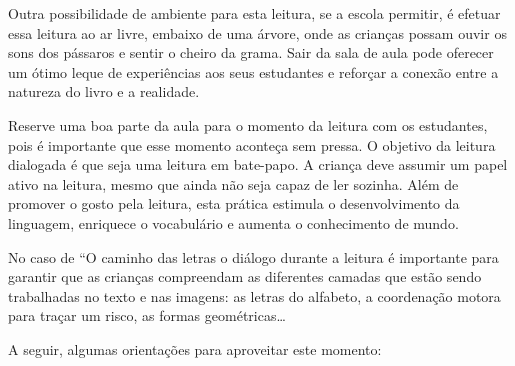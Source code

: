 \documentclass[11pt]{extarticle}
\begin{document}

Outra possibilidade de ambiente para esta leitura, se a escola permitir, 
é efetuar essa leitura ao ar livre, embaixo de uma árvore, onde as crianças 
possam ouvir os sons dos pássaros e sentir o cheiro da grama. Sair da sala 
de aula pode oferecer um ótimo leque de experiências aos seus estudantes e 
reforçar a conexão entre a natureza do livro e a realidade.  

Reserve uma boa parte da aula para o momento da leitura com os estudantes, 
pois é importante que esse momento aconteça sem pressa. O objetivo da 
leitura dialogada é que seja uma leitura em bate-papo. A criança deve 
assumir um papel ativo na leitura, mesmo que ainda não seja capaz de 
ler sozinha. Além de promover o gosto pela leitura, esta prática estimula 
o desenvolvimento da linguagem, enriquece o vocabulário e 
aumenta o conhecimento de mundo.

No caso de ``O caminho das letras o diálogo durante a leitura é 
importante para garantir que as crianças compreendam as diferentes
camadas que estão sendo trabalhadas no texto e nas imagens: 
as letras do alfabeto, a coordenação motora para traçar um risco, 
as formas geométricas\dots{}

A seguir, algumas orientações para aproveitar este momento: 
\end{document}
